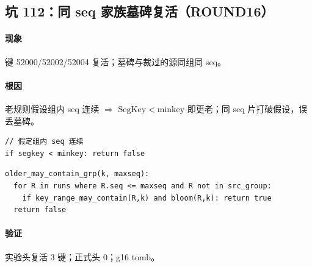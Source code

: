 \subsection{坑 112：同 seq 家族墓碑复活（ROUND16）}
\paragraph{现象}
键 52000/52002/52004 复活；墓碑与裁过的源同组同 seq。

\paragraph{根因}
老规则假设组内 seq 连续 $\Rightarrow$ $\mathrm{SegKey}<\mathrm{minkey}$ 即更老；同 seq 片打破假设，误丢墓碑。

\begin{figure}[H]
\centering
{}
\end{figure}

\begin{fixold}
\begin{lstlisting}[language=pseudo]
// 假定组内 seq 连续
if segkey < minkey: return false
\end{lstlisting}
\end{fixold}

\begin{fixnew}
\begin{lstlisting}[language=pseudo]
older_may_contain_grp(k, maxseq):
  for R in runs where R.seq <= maxseq and R not in src_group:
    if key_range_may_contain(R,k) and bloom(R,k): return true
  return false
\end{lstlisting}
\end{fixnew}

\paragraph{验证}
实验头复活 3 键；正式头 0；g16 tomb。

